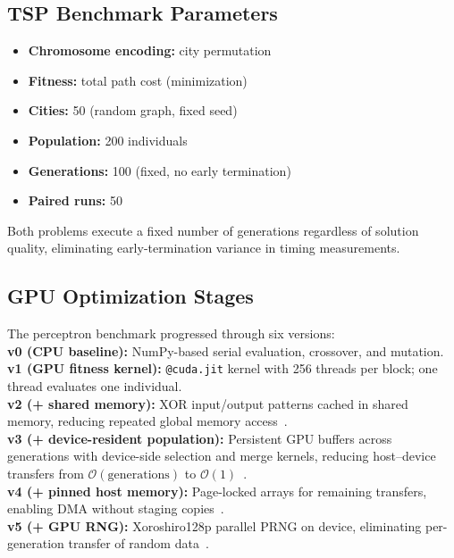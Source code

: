 \documentclass[a4paper,14pt]{extarticle}
\begin{document}
\subsection{TSP Benchmark Parameters}

\begin{itemize}
  \item \textbf{Chromosome encoding:} city permutation
  \item \textbf{Fitness:} total path cost (minimization)~\cite{hussain2017genetic}
  \item \textbf{Cities:} 50 (random graph, fixed seed)
  \item \textbf{Population:} 200 individuals
  \item \textbf{Generations:} 100 (fixed, no early termination)
  \item \textbf{Paired runs:} 50
\end{itemize}

Both problems execute a fixed number of generations regardless of solution quality, eliminating
early-termination variance in timing measurements.

\subsection{GPU Optimization Stages}

The perceptron benchmark progressed through six versions:\\
\textbf{v0 (CPU baseline):} NumPy-based serial evaluation, crossover, and mutation.\\
\textbf{v1 (GPU fitness kernel):} \texttt{@cuda.jit} kernel with 256 threads per block;
one thread evaluates one individual.\\
\textbf{v2 (+ shared memory):} XOR input/output patterns cached in shared memory,
reducing repeated global memory access~\cite{nvidia2011cuda}.\\
\textbf{v3 (+ device-resident population):} Persistent GPU buffers across generations
with device-side selection and merge kernels, reducing host--device transfers from
$\mathcal{O}(\text{generations})$ to $\mathcal{O}(1)$~\cite{harris2012optimize}.\\
\textbf{v4 (+ pinned host memory):} Page-locked arrays for remaining transfers,
enabling DMA without staging copies~\cite{nvidia2024cuda}.\\
\textbf{v5 (+ GPU RNG):} Xoroshiro128p parallel PRNG on device, eliminating
per-generation transfer of random data~\cite{xoroshiro}.
\end{document}
